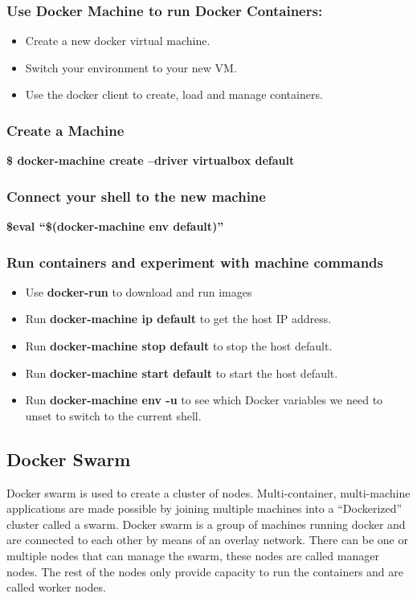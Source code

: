 \documentclass[12pt]{article}
\begin{document}
\subsubsection{Use Docker Machine to run Docker Containers:}
\begin{itemize}
	\item Create a new docker virtual machine.
	\item Switch your environment to your new VM.
	\item Use the docker client to create, load and manage containers.
\end{itemize}
\subsubsection{Create a Machine}
\textbf{\$ docker-machine create --driver virtualbox default}
\subsubsection{Connect your shell to the new machine}
\textbf{\$eval “\$(docker-machine env default)”}
\subsubsection{Run containers and experiment with machine commands}
\begin{itemize}
	\item Use \textbf{docker-run} to download and run images
	\item Run \textbf{docker-machine ip default} to get the host IP address.
	\item Run \textbf{docker-machine stop default} to stop the host default.
	\item Run \textbf{docker-machine start default} to start the host default.
	\item Run \textbf{docker-machine env -u} to see which Docker variables we need to unset to switch to the current shell.
\end{itemize}
\subsection{Docker Swarm}
Docker swarm is used to create a cluster of nodes. Multi-container, multi-machine applications are made possible by joining multiple machines into a “Dockerized” cluster called a swarm. Docker swarm is a group of machines running docker and are connected to each other by means of an overlay network. There can be one or multiple nodes that can manage the swarm, these nodes are called manager nodes. The rest of the nodes only provide capacity to run the containers and are called worker nodes. 
\end{document}

